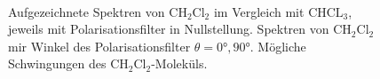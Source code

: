 \documentclass[../bericht.tex]{subfiles}
\begin{document}
\begin{figure}
{
            \label{fig:ch2cl2}
          } \\
          \caption[Aufgezeichnete Spektren von $\mathrm{CH_2Cl_2}$ und mögliche Schwingungen des Moleküls.]{\protect{} Aufgezeichnete Spektren von $\mathrm{CH_2Cl_2}$ im Vergleich mit $\mathrm{CHCL_3}$, jeweils mit Polarisationsfilter in Nullstellung. \protect{} Spektren von $\mathrm{CH_2Cl_2}$ mir Winkel des Polarisationsfilter $\theta=\ang{0},\ang{90}$. \protect{} Mögliche Schwingungen des $\mathrm{CH_2Cl_2}$-Moleküls. \cite{herzberg}}
          \label{fig:ch2cl2-analyse}
        \end{figure}
\end{document}
